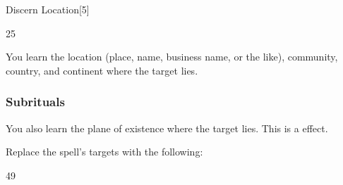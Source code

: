 \begin{spellsection}{Discern Location}[5]

\begin{spellcontent}

\begin{spelltargetinginfo}


 25
\end{spelltargetinginfo}


\begin{spelleffects}



\spelleffect
You learn the location (place, name, business name, or the like), community, country, and continent where the target lies.








\end{spelleffects}

\end{spellcontent}
\begin{spellfooter}


\end{spellfooter}
\begin{spellsubcontent}


\end{spellsubcontent}
\end{spellsection}


\subsubsection{Subrituals}



You also learn the plane of existence where the target lies.
This is a  effect.



Replace the spell's targets with the following:
\begin{spellcontent}

\begin{augmenttargetinginfo}


 49
\end{augmenttargetinginfo}

\end{spellcontent}





